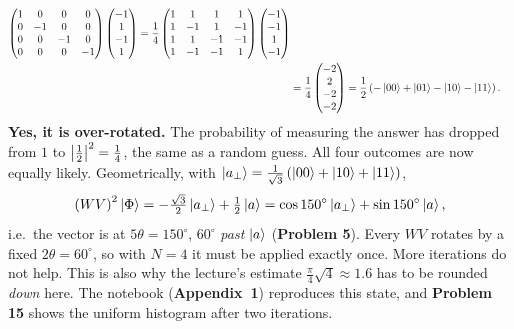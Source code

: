 \documentclass[a4paper, 10pt]{article}
\begin{document}
\begin{solution}
\begin{align*}
		\begin{pmatrix}
			1 & 0  & 0  & 0  \\
			0 & -1 & 0  & 0  \\
			0 & 0  & -1 & 0  \\
			0 & 0  & 0  & -1
		\end{pmatrix}
		\begin{pmatrix} -1 \\ 1 \\ -1 \\ 1 \end{pmatrix}
		= \frac{1}{4}\begin{pmatrix}
			             1 & 1  & 1  & 1  \\
			             1 & -1 & 1  & -1 \\
			             1 & 1  & -1 & -1 \\
			             1 & -1 & -1 & 1
		             \end{pmatrix}
		\begin{pmatrix} -1 \\ -1 \\ 1 \\ -1 \end{pmatrix}                             \\
		 & = \frac{1}{4}\begin{pmatrix} -2 \\ 2 \\ -2 \\ -2 \end{pmatrix}
		= \frac{1}{2}\left(-\ket{00} + \ket{01} - \ket{10} - \ket{11}\right).
	\end{align*}
	\noindent \textbf{Yes, it is over-rotated.} The probability of measuring the answer has dropped from \( 1 \) to \( \left|\tfrac{1}{2}\right|^2 = \tfrac{1}{4} \), the same as a random guess. All four outcomes are now equally likely.
	Geometrically, with \( \ket{a_\perp} = \tfrac{1}{\sqrt{3}}\left(\ket{00} + \ket{10} + \ket{11}\right) \),
	\[
		\left(WV\right)^2\ket{\Phi} = -\tfrac{\sqrt{3}}{2}\ket{a_\perp} + \tfrac{1}{2}\ket{a} = \cos 150^\circ\ket{a_\perp} + \sin 150^\circ\ket{a},
	\]
	i.e.\ the vector is at \( 5\theta = 150^\circ \), \( 60^\circ \) \emph{past} \( \ket{a} \) (\textbf{Problem 5}). Every \( WV \) rotates by a fixed \( 2\theta = 60^\circ \), so with \( N = 4 \) it must be applied exactly once.
	More iterations do not help. This is also why the lecture's estimate \( \tfrac{\pi}{4}\sqrt{4} \approx 1.6 \) has to be rounded \emph{down} here. The notebook (\textbf{Appendix~1}) reproduces this state, and \textbf{Problem 15} shows the uniform histogram after two iterations.
\end{solution}
\end{document}
